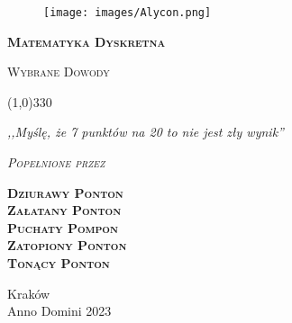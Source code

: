 \begin{titlepage} 

    \begin{center}
         \begin{figure}[h]
            \centering
            \texttt{[image: images/Alycon.png]}
        \end{figure}
        \vspace{0.5cm}
        \Huge
        \textbf{\textsc{Matematyka Dyskretna}}
        
        \vspace{0.5cm}
        \Large
        \textsc{Wybrane Dowody}
        
        \normalsize
        
        
        \line(1,0){330}
        
        \vspace{1cm}
        \textit{,,Myślę, że 7 punktów na 20 to nie jest zły wynik''}
        \vspace{1cm}

        \textit{\textsc{Popełnione przez}}\\
        \vspace{5mm}
  
        \textbf{\textsc{Dziurawy Ponton \\ Załatany Ponton \\ Puchaty Pompon \\ Zatopiony Ponton \\ Tonący Ponton}}
 
        \vfill

        Kraków \\
        Anno Domini 2023
        
    \end{center}
    
\end{titlepage}